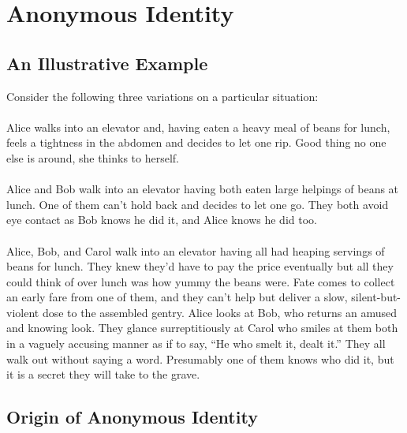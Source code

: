 \documentclass[pra,twocolumn,groupedaddress,10pt]{revtex4}
\theoremstyle{definition}
\begin{document}
\section{Anonymous Identity} \label{sec:anoide}

\subsection{An Illustrative Example} \label{sec:illexa}

Consider the following three variations on a particular situation:

\paragraph{}

Alice walks into an elevator and, having eaten a heavy meal of beans for lunch, feels a tightness in the abdomen and decides to let one rip. Good thing no one else is around, she thinks to herself.

\paragraph{}

Alice and Bob walk into an elevator having both eaten large helpings of beans at lunch. One of them can't hold back and decides to let one go. They both avoid eye contact as Bob knows he did it, and Alice knows he did too.

\paragraph{}

Alice, Bob, and Carol walk into an elevator having all had heaping servings of beans for lunch. They knew they'd have to pay the price eventually but all they could think of over lunch was how yummy the beans were. Fate comes to collect an early fare from one of them, and they can't help but deliver a slow, silent-but-violent dose to the assembled gentry. Alice looks at Bob, who returns an amused and knowing look. They glance surreptitiously at Carol who smiles at them both in a vaguely accusing manner as if to say, ``He who smelt it, dealt it.'' They all walk out without saying a word. Presumably one of them knows who did it, but it is a secret they will take to the grave.

\subsection{Origin of Anonymous Identity} \label{sec:orianoide}
\end{document}
